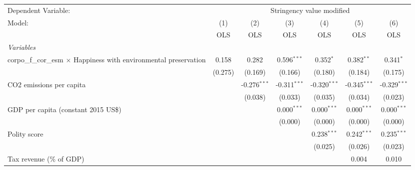 
\begingroup
\centering
\begin{tabular}{lcccccc}
   \toprule
   Dependent Variable: & \multicolumn{6}{c}{Stringency value modified}\\
   Model:                                                                    & (1)     & (2)            & (3)            & (4)            & (5)            & (6)\\  
                                                                             &  OLS    & OLS            & OLS            & OLS            & OLS            & OLS\\  
   \midrule
   \emph{Variables}\\
   corpo\_f\_cor\_esm $\times$ Happiness with environmental preservation     & 0.158   & 0.282          & 0.596$^{***}$  & 0.352$^{*}$    & 0.382$^{**}$   & 0.341$^{*}$\\   
                                                                             & (0.275) & (0.169)        & (0.166)        & (0.180)        & (0.184)        & (0.175)\\   
   CO2 emissions per capita                                                  &         & -0.276$^{***}$ & -0.311$^{***}$ & -0.320$^{***}$ & -0.345$^{***}$ & -0.329$^{***}$\\   
                                                                             &         & (0.038)        & (0.033)        & (0.035)        & (0.034)        & (0.023)\\   
   GDP per capita (constant 2015 US\$)                                       &         &                & 0.000$^{***}$  & 0.000$^{***}$  & 0.000$^{***}$  & 0.000$^{***}$\\   
                                                                             &         &                & (0.000)        & (0.000)        & (0.000)        & (0.000)\\   
   Polity score                                                              &         &                &                & 0.238$^{***}$  & 0.242$^{***}$  & 0.235$^{***}$\\   
                                                                             &         &                &                & (0.025)        & (0.026)        & (0.023)\\   
   Tax revenue (\% of GDP)                                                   &         &                &                &                & 0.004          & 0.010\\   

\end{tabular}
